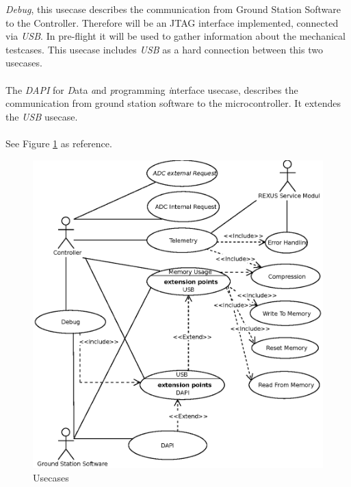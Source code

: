 \textit{Debug}, this usecase describes the communication from Ground Station Software to the Controller. Therefore will be an JTAG interface implemented, connected via \textit{USB}. In pre-flight it will be used to gather information about the mechanical testcases. This usecase includes \textit{USB} as a hard connection  between this two usecases. \\ \\
The \textit{DAPI} for \textit{D}ata \textit{a}nd \textit{p}rogramming  \textit{i}nterface usecase, describes the communication from ground station software to the microcontroller. It extendes the \textit{USB} usecase.\\ \\
See Figure \ref{fig:usecase} as reference. 
\pagebreak
\begin{figure}[htb]
	\centering
	  \includegraphics{SoftwareDesign/HERMESS_USECASE.eps}
	\caption{Usecases}
	\label{fig:usecase}
\end{figure}
\pagebreak
